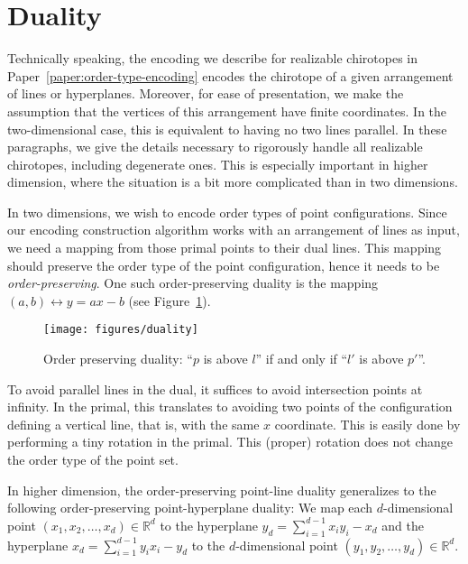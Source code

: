 \section{Duality}%
\label{sec:point-configurations:duality}

Technically speaking, the encoding we describe for realizable chirotopes
in Paper~\ref{paper:order-type-encoding}
encodes the chirotope of a given arrangement of lines or hyperplanes.
Moreover, for ease of presentation, we make the assumption that the vertices of
this arrangement have finite coordinates. In the two-dimensional case, this
is equivalent to having no two lines parallel. In these paragraphs, we give the
details necessary to rigorously handle all realizable chirotopes, including
degenerate ones. This is especially important in higher dimension, where the
situation is a bit more complicated than in two dimensions.

In two dimensions, we wish to encode order types of point configurations.
Since our encoding construction algorithm works with an arrangement of lines as
input, we need a mapping from those primal points to their dual lines. This
mapping should preserve the order type of the point configuration, hence it
needs to be \emph{order-preserving}. One such order-preserving duality is
the mapping \((a,b) \leftrightarrow y = ax - b\) (see Figure~\ref{fig:duality}).

\begin{figure}
  \centering{}
  \texttt{[image: figures/duality]}
  \caption{Order preserving duality: ``\(p\) is above \(l\)'' if and only if
  ``\(l'\) is above \(p'\)''.}\label{fig:duality}
\end{figure}

To avoid parallel lines in the dual, it suffices to avoid intersection points
at infinity. In the primal, this translates to avoiding two points of the
configuration defining a vertical line, that is, with the same \(x\) coordinate.
This is easily done by performing a tiny rotation in the primal.
This (proper) rotation does not change the order type of the point set.

In higher dimension, the order-preserving point-line duality generalizes
to the following order-preserving point-hyperplane duality: We map each
\(d\)-dimensional point \((x_1, x_2, \ldots, x_d) \in \mathbb{R}^d\) to the hyperplane \(y_d =
\sum_{i=1}^{d-1} x_i y_i - x_d \) and the hyperplane \(x_d = \sum_{i=1}^{d-1}
y_i x_i - y_d \) to the \(d\)-dimensional point \(( y_1, y_2, \ldots, y_d) \in
\mathbb{R}^d\).

